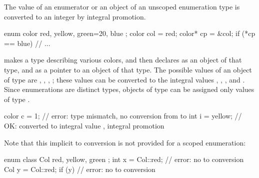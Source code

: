 \pnum
The value of an enumerator or an object of an unscoped enumeration type is
converted to an integer by integral promotion.
\begin{example}
\begin{codeblock}
enum color { red, yellow, green=20, blue };
color col = red;
color* cp = &col;
if (*cp == blue)                // ...
\end{codeblock}
makes  a type describing various colors, and then declares
 as an object of that type, and  as a pointer to an
object of that type. The possible values of an object of type
 are , , ,
; these values can be converted to the integral values
, , , and . Since enumerations are
distinct types, objects of type  can be assigned only
values of type .
\begin{codeblock}
color c = 1;                    // error: type mismatch, no conversion from  to 
int i = yellow;                 // OK:  converted to integral value , integral promotion
\end{codeblock}
Note that this implicit  to 
conversion is not provided for a scoped enumeration:
\begin{codeblock}
enum class Col { red, yellow, green };
int x = Col::red;               // error: no  to  conversion
Col y = Col::red;
if (y) { }                      // error: no  to  conversion
\end{codeblock}
\end{example}

